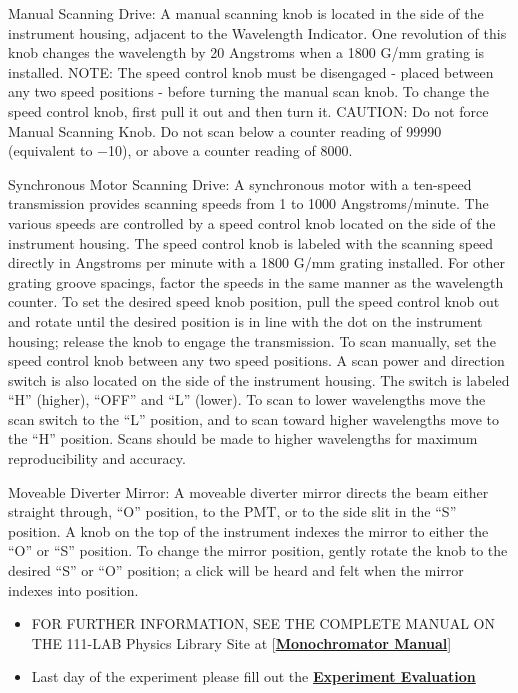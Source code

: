 \documentclass{../lab}
\begin{document}
Manual Scanning Drive: A manual scanning knob is located in the side of the instrument housing, adjacent to the Wavelength Indicator. One revolution of this knob changes the wavelength by 20 Angstroms when a 1800 G/mm grating is installed. NOTE: The speed control knob must be disengaged - placed between any two speed positions - before turning the manual scan knob. To change the speed control knob, first pull it out and then turn it. CAUTION: Do not force Manual Scanning Knob. Do not scan below a counter reading of 99990 (equivalent to $-$10), or above a counter reading of 8000.

Synchronous Motor Scanning Drive: A synchronous motor with a ten-speed transmission provides scanning speeds from 1 to 1000 Angstroms/minute. The various speeds are controlled by a speed control knob located on the side of the instrument housing. The speed control knob is labeled with the scanning speed directly in Angstroms per minute with a 1800 G/mm grating installed. For other grating groove spacings, factor the speeds in the same manner as the wavelength counter. To set the desired speed knob position, pull the speed control knob out and rotate until the desired position is in line with the dot on the instrument housing; release the knob to engage the transmission. To scan manually, set the speed control knob between any two speed positions. A scan power and direction switch is also located on the side of the instrument housing. The switch is labeled ``H'' (higher), ``OFF'' and ``L'' (lower). To scan to lower wavelengths move the scan switch to the ``L'' position, and to scan toward higher wavelengths move to the ``H'' position. Scans should be made to higher wavelengths for maximum reproducibility and accuracy.

Moveable Diverter Mirror: A moveable diverter mirror directs the beam either straight through, ``O'' position, to the PMT, or to the side slit in the ``S'' position. A knob on the top of the instrument indexes the mirror to either the ``O'' or ``S'' position. To change the mirror position, gently rotate the knob to the desired ``S'' or ``O'' position; a click will be heard and felt when the mirror indexes into position.

\begin{itemize}
    \item FOR FURTHER INFORMATION, SEE THE COMPLETE MANUAL ON THE 111-LAB Physics Library Site at [\href{http://physics111.lib.berkeley.edu/Physics111/Equipment\_Manuals/ATM\_Equipment\_Manuals/07-monochrometerAM505.pdf}{\textbf{Monochromator Manual}}]

    \item Last day of the experiment please fill out the \href{\ExperimentEvaluation}{\textbf{Experiment Evaluation}}

\end{itemize}
\end{document}
